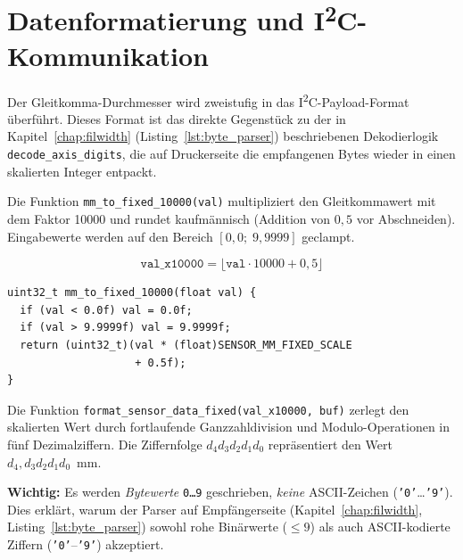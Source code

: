 \section{Datenformatierung und I\textsuperscript{2}C-Kommunikation}
\label{sec:sensor_formatierung}


Der Gleitkomma-Durchmesser wird zweistufig in das I\textsuperscript{2}C-Payload-Format überführt.
Dieses Format ist das direkte Gegenstück zu der in Kapitel~\ref{chap:filwidth} (Listing~\ref{lst:byte_parser}) beschriebenen Dekodierlogik \texttt{decode\_axis\_digits}, die auf Druckerseite die empfangenen Bytes wieder in einen skalierten Integer entpackt.


Die Funktion \texttt{mm\_to\_fixed\_10000(val)} multipliziert den Gleitkommawert mit dem Faktor \num{10000} und rundet kaufmännisch (Addition von $0{,}5$ vor Abschneiden).
Eingabewerte werden auf den Bereich $[0{,}0;\; 9{,}9999]$ geclampt.

\begin{equation}
  \mathtt{val\_x10000} = \lfloor \mathtt{val} \cdot 10000 + 0{,}5 \rfloor
\end{equation}

\begin{lstlisting}[style=firmwarestyle, caption={Fixed-Point-Skalierung (\texttt{mm\_to\_fixed\_10000}, Z.~215--219).}, label={lst:sensor_mm_to_fixed}]
uint32_t mm_to_fixed_10000(float val) {
  if (val < 0.0f) val = 0.0f;
  if (val > 9.9999f) val = 9.9999f;
  return (uint32_t)(val * (float)SENSOR_MM_FIXED_SCALE
                    + 0.5f);
}
\end{lstlisting}


Die Funktion \texttt{format\_sensor\_data\_fixed(val\_x10000, buf)} zerlegt den skalierten Wert durch fortlaufende Ganzzahldivision und Modulo-Operationen in fünf Dezimalziffern.
Die Ziffernfolge $d_4 d_3 d_2 d_1 d_0$ repräsentiert den Wert $d_4{,}d_3 d_2 d_1 d_0$~mm.

\textbf{Wichtig:} Es werden \emph{Bytewerte} \texttt{0\dots9} geschrieben, \emph{keine} ASCII-Zeichen (\texttt{'0'}\dots\texttt{'9'}).
Dies erklärt, warum der Parser auf Empfängerseite (Kapitel~\ref{chap:filwidth}, Listing~\ref{lst:byte_parser}) sowohl rohe Binärwerte ($\leq 9$) als auch ASCII-kodierte Ziffern (\texttt{'0'}--\texttt{'9'}) akzeptiert.

